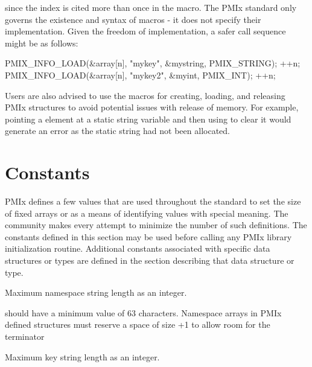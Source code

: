 since the index is cited more than once in the macro. The \ac{PMIx} standard only governs the existence and syntax of macros - it does not specify their implementation. Given the freedom of implementation, a safer call sequence might be as follows:

\begin{codepar}
PMIX_INFO_LOAD(&array[n], "mykey", &mystring, PMIX_STRING);
++n;
PMIX_INFO_LOAD(&array[n], "mykey2", &myint, PMIX_INT);
++n;
\end{codepar}

Users are also advised to use the macros for creating, loading, and releasing
\ac{PMIx} structures to avoid potential issues with release of memory. For
example, pointing a  element at a static string
variable and then using  to clear it would
generate an error as the static string had not been allocated.

\adviceuserend

\section{Constants}
\label{chap:struct:const}

\ac{PMIx} defines a few values that are used throughout the standard to set the size of fixed arrays or as a means of identifying values with special meaning.
The community makes every attempt to minimize the number of such definitions.
The constants defined in this section may be used before calling any \ac{PMIx} library initialization routine.
Additional constants associated with specific data structures or types are defined in the section describing that data structure or type.

\begin{constantdesc}
%
Maximum namespace string length as an integer.
\end{constantdesc}

\adviceimplstart
{} should have a minimum value of 63 characters. Namespace arrays in \ac{PMIx} defined structures must reserve
a space of size +1 to allow room for the  terminator
\adviceimplend

\begin{constantdesc}
%
Maximum key string length as an integer.
\end{constantdesc}

